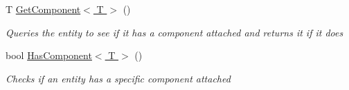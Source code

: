\begin{DoxyCompactItemize}
T \hyperlink{class_midnight_blue_1_1_engine_1_1_entity_component_1_1_entity_a897432decc39ee42eac559e88cab20a7}{Get\+Component$<$ T $>$} ()
\begin{DoxyCompactList}\small\item\em Queries the entity to see if it has a component attached and returns it if it does \end{DoxyCompactList}\item 
bool \hyperlink{class_midnight_blue_1_1_engine_1_1_entity_component_1_1_entity_a3ee2ffd693e66d08f623cb0b4279306f}{Has\+Component$<$ T $>$} ()
\begin{DoxyCompactList}\small\item\em Checks if an entity has a specific component attached \end{DoxyCompactList}\end{DoxyCompactItemize}

